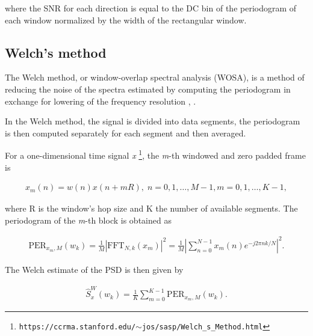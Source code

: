 	where the SNR for each direction is equal to the DC bin of the periodogram of each window normalized by the width of the rectangular window.
	
	
	\subsection{Welch's method}
	
	The Welch method, or window-overlap spectral analysis (WOSA), is a method of reducing the noise of the spectra estimated by computing the periodogram in exchange for lowering of the frequency resolution \cite{Welch_period}, \cite{Spagnolini_ch14}.

	In the Welch method, the signal is divided into data segments, the periodogram is then computed separately for each segment and then averaged.
	
	For a one-dimensional time signal \textit{x} \cite{SASPWEB2011}\footnote{\texttt{https://ccrma.stanford.edu/$\sim$jos/sasp/Welch\_s\_Method.html}}, the \textit{m}-th windowed and zero padded frame is
	
	\begin{align}
		x_m(n) = w(n)x(n + mR), \; n=0,1,\ldots, M-1, m=0,1,\ldots, K-1,
	\end{align}
	
	where R is the window's hop size and K the number of available segments. The periodogram of the \textit{m}-th block is obtained as
	
	\begin{align}
		\text{PER}_{x_m,M}(w_k) = \frac{1}{M} |\text{FFT}_{N,k}(x_m)|^2 = \frac{1}{M}\left|\sum_{n=0}^{N-1}x_m(n)e^{-j2\pi nk/N}\right|^2.
	\end{align}
	
	The Welch estimate of the PSD is then given by
	
	\begin{align}
		\hat{S}^W_x(w_k) = \frac{1}{K}\sum_{m=0}^{K-1}\text{PER}_{x_m,M}(w_k).
	\end{align}
	
	

	

    
    
    